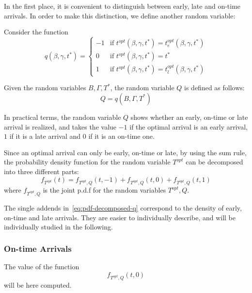 In the first place,
 it is convenient to distinguish between early, late and on-time arrivals.
In order to make this distinction, we define another random variable:
\begin{definition}
  Consider the function
  \begin{equation*}
    q(\beta, \gamma, t^*) =
    \begin{cases}
      -1 & \text{if } t^{opt}(\beta, \gamma, t^*) = t_e^{opt}(\beta, \gamma, t^*) \\
      0 & \text{if } t^{opt}(\beta, \gamma, t^*) = t^* \\
      1 & \text{if } t^{opt}(\beta, \gamma, t^*) = t_l^{opt}(\beta, \gamma, t^*)
    \end{cases}
  \end{equation*}

  Given the random variables \(B, \Gamma, T^*\), the random variable \(Q\) is defined as follows:
  \begin{equation*}
    Q  = q(B, \Gamma, T^*)
  \end{equation*}
\end{definition}

In practical terms, the random variable \(Q\) shows whether an early, on-time or late arrival is realized,
and takes the value \(-1\) if the optimal arrival is an early arrival,
\(1\) if it is a late arrival and \(0\) if it is an on-time one.

Since an optimal arrival can only be early, on-time or late,
by using the sum rule,
the probability density function for the random variable \(T^{opt}\) can be decomposed into three different parts:
\begin{equation}
  \label{eq:pdf-decomposed-q}
  f_{T^{opt}}(t) = f_{T^{opt}, Q}(t, -1) + f_{T^{opt}, Q}(t, 0) + f_{T^{opt}, Q}(t, 1)
\end{equation}
where \(f_{T^{opt}, Q}\) is the joint p.d.f for the random variables \(T^{opt}, Q\).

The single addends in~\eqref{eq:pdf-decomposed-q}
correspond to the density of early, on-time and late arrivals.
They are easier to individually describe,
and will be individually studied in the following.

\subsubsection{On-time Arrivals}

The value of the function
\begin{equation*}
  f_{T^{opt}, Q}(t, 0)
\end{equation*}
will be here computed.

